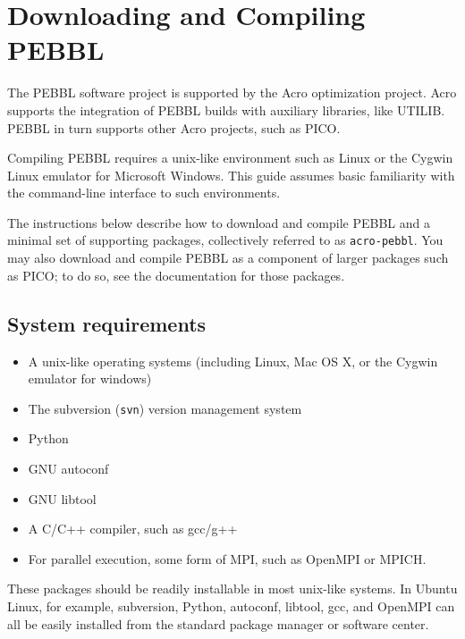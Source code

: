 \section{Downloading and Compiling PEBBL}
\label{sec:downloadcompile}
The PEBBL software project is supported by the Acro optimization
project.  Acro supports the integration of PEBBL builds with auxiliary
libraries, like UTILIB.  PEBBL in turn supports other Acro projects,
such as PICO.

Compiling PEBBL requires a unix-like environment such as Linux or the
Cygwin Linux emulator for Microsoft Windows.  This guide assumes basic
familiarity with the command-line interface to such environments.

The instructions below describe how to download and compile PEBBL and
a minimal set of supporting packages, collectively referred to as
\texttt{acro-pebbl}.  You may also download and compile PEBBL as a
component of larger packages such as PICO; to do so, see the
documentation for those packages.


\subsection{System requirements}
\begin{itemize}
\item A unix-like operating systems (including Linux, Mac OS X, or the
  Cygwin emulator for windows)
\vspace{-1.8ex}
\item The subversion (\texttt{svn}) version management system
\vspace{-1.8ex}
\item Python
\vspace{-1.8ex}
\item GNU autoconf
\vspace{-1.8ex}
\item GNU libtool
\vspace{-1.8ex}
\item A C/C++ compiler, such as gcc/g++
\vspace{-1.8ex}
\item For parallel execution, some form of MPI, such as OpenMPI or MPICH.
\end{itemize}
These packages should be readily installable in most unix-like
systems.  In Ubuntu Linux, for example, subversion, Python, autoconf, libtool,
gcc, and OpenMPI can all be easily installed from the standard package
manager or software center.

